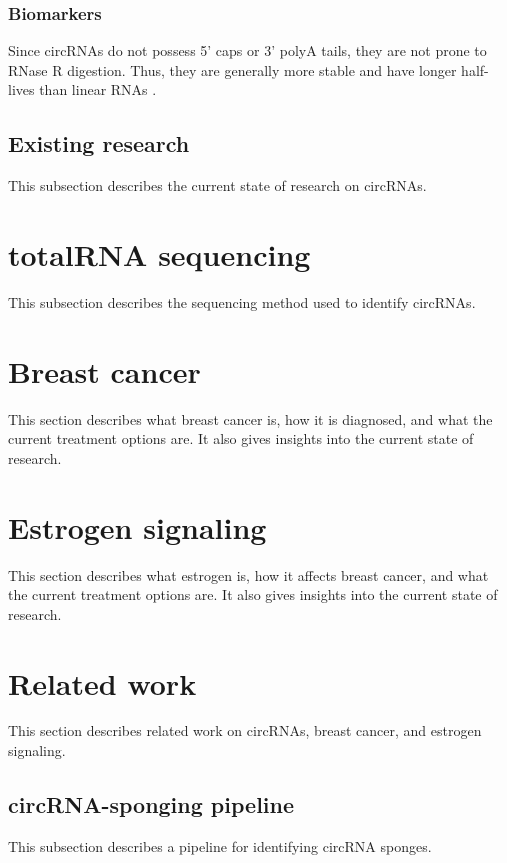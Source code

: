 \subsubsection{Biomarkers}
Since circRNAs do not possess 5' caps or 3' polyA tails, they are not prone to
RNase R digestion. Thus, they are generally more stable and have longer
half-lives than linear RNAs \supercite{kristensen_biogenesis_2019}.

\subsection{Existing research}
This subsection describes the current state of research on circRNAs.

\section{totalRNA sequencing}
This subsection describes the sequencing method used to identify circRNAs.

\lipsum[2]

\section{Breast cancer}
This section describes what breast cancer is, how it is diagnosed, and what the
current treatment options are. It also gives insights into the current state of
research.

\lipsum[3]

\section{Estrogen signaling}
This section describes what estrogen is, how it affects breast cancer, and what
the current treatment options are. It also gives insights into the current state
of research.

\lipsum[4]

\section{Related work}
This section describes related work on circRNAs, breast cancer, and estrogen
signaling.

\subsection{circRNA-sponging pipeline}
This subsection describes a pipeline for identifying circRNA sponges.